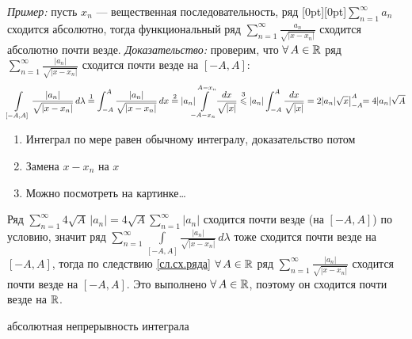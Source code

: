\begin{zam}[https://youtu.be/GUSonewbqy0?si=E69Fo7vCv8IfzgSo&t=1734]
	\textit{Пример:} пусть $x_n$ --- вещественная последовательность, ряд \raisebox{0pt}[0pt][0pt]{$\sum\limits_{n = 1}^\infty a_n$} сходится абсолютно, тогда функциональный ряд $\sum\limits_{n = 1}^\infty \frac{a_n}{\sqrt{|x - x_n|}}$ сходится абсолютно почти везде. \textit{Доказательство:} проверим, что $\A A \in \rr$ ряд $\sum\limits_{n = 1}^\infty \frac{|a_n|}{\sqrt{|x - x_n|}}$ сходится почти везде на $[-A, A]$: 
	\[\int\limits_{[-A, A]} \frac{|a_n|}{\sqrt{|x - x_n|}} \, d\lambda \stackrel{1}{=} \int_{-A}^A \frac{|a_n|}{\sqrt{|x - x_n|}} \, d x \stackrel{2}{=} |a_n|\!\!\!\int\limits_{-A - x_n}^{A - x_n}\!\!\frac{dx}{\sqrt{|x|}} \stackrel{3}{\<} |a_n|\int_{-A}^{A}\frac{dx}{\sqrt{|x|}} = 2|a_n|\sqrt{x} \vp[A]{-A} \!\!= 4 |a_n| \sqrt{A}\]
	\begin{enumerate}
		\item Интеграл по мере равен обычному интегралу, доказательство потом
		
		\item Замена $x - x_n$ на $x$
		
		\item Можно посмотреть на картинке\dots
	\end{enumerate}
	\hspace{20pt}Ряд $\sum\limits_{n = 1}^\infty 4\sqrt{A}\,|a_n| = 4\sqrt{A}\sum\limits_{n = 1}^\infty|a_n|$ сходится почти везде (на $[-A, A]$) по условию, значит ряд $\sum\limits_{n = 1}^\infty\int\limits_{[-A, A]} \frac{|a_n|}{\sqrt{|x - x_n|}} \, d\lambda$ тоже сходится почти везде на $[-A, A]$, тогда по следствию \ref{сл.сх.ряда} $\A A \in \rr$ ряд $\sum\limits_{n = 1}^\infty \frac{|a_n|}{\sqrt{|x - x_n|}}$ сходится почти везде на $[-A, A]$. Это выполнено $\A A \in \rr$, поэтому он сходится почти везде на $\rr$.
\end{zam}

\begin{teor}{абсолютная непрерывность интеграла}
	
\end{teor}

